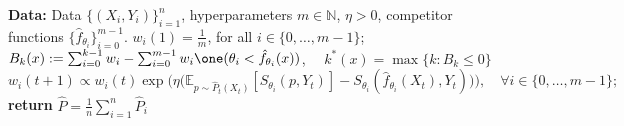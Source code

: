 



\begin{algorithm}
    \caption{Two-player game based single quantile omniprediction (batch version)} \label{alg:omni-twoplayer_q}
    \begin{algorithmic}[1]
    \State \textbf{Data:} Data $\{(X_i, Y_i)\}_{i=1}^n$, hyperparameters $m \in \mathbb{N}$, $\eta > 0$, competitor functions $\{\hat{f}_{\theta_i}\}_{i=0}^{m-1}$.
    \State $w_i(1) = \frac{1}{m}$, for all $i \in \{0, \ldots, m-1\}$;
        \State $B_k(x) := \sum_{i=0}^{k-1} w_i - \sum_{i=0}^{m-1}w_i \one(\theta_i < \hat{f}_{\theta_i}(x))$, $\quad k^*(x) = \max\{k: B_k \leq 0\}$
        \State 
        \State $w_i(t+1) \propto w_i(t) \exp\bigl(\eta \big(\mathbb{E}_{p \sim \hat{P}_t(X_t)}[S_{\theta_i}(p, Y_t)] 
            - S_{\theta_i}(\hat{f}_{\theta_i}(X_t), Y_t)\big)\bigr), \quad \forall i \in \{0, \ldots, m-1\};$
    \EndFor
    \State \textbf{return} $\hat{P} = \frac{1}{n} \sum_{i=1}^n \hat{P}_i$
    \end{algorithmic}
\end{algorithm}

